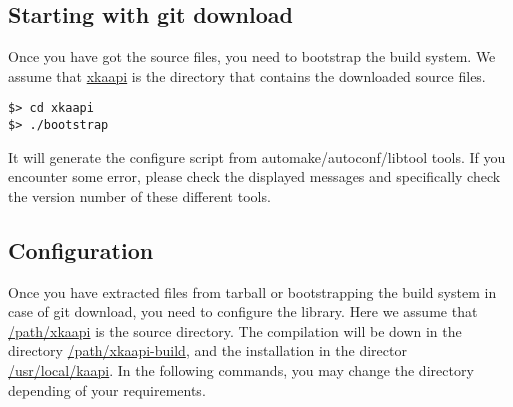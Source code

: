 \documentclass{article}
\begin{document}
\subsection{Starting with git download}
Once you have got the source files, you need to bootstrap the build system. We assume that \url{xkaapi} is the directory that contains the downloaded source files.
\begin{verbatim}
$> cd xkaapi
$> ./bootstrap
\end{verbatim}
It will generate the configure script from automake/autoconf/libtool tools. 
If you encounter some error, please check the displayed messages and specifically check the version number of these different tools.

\subsection{Configuration} \label{sec:config}
Once you have extracted files from tarball or bootstrapping the build system in case of git download, you need to configure the library.
Here we assume that \url{/path/xkaapi} is the source directory. The compilation will be down in the directory \url{/path/xkaapi-build}, and the installation in the director \url{/usr/local/kaapi}. In the following commands, you may change the directory depending of your requirements.
\end{document}
